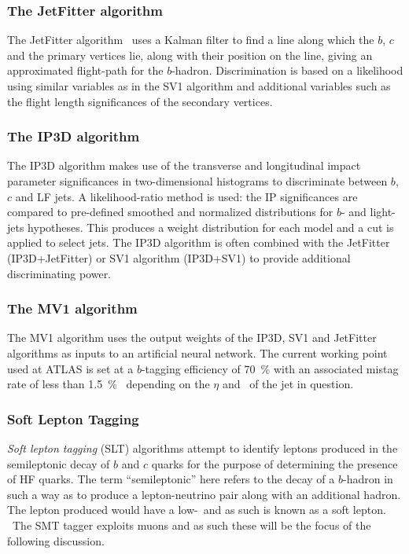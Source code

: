 \subsubsection{The JetFitter algorithm}

The JetFitter algorithm~\cite{Detector:TaggingJetFitter} uses a Kalman filter to find a line along which the $b$, $c$ and the primary vertices lie, along with their position on the line, giving an approximated flight-path for the $b$-hadron. Discrimination is based on a likelihood using similar variables as in the SV1 algorithm and additional variables such as the flight length significances of the secondary vertices.

\subsubsection{The IP3D algorithm}

The IP3D algorithm makes use of the transverse and longitudinal impact parameter significances in two-dimensional histograms to discriminate between $b$, $c$ and LF jets. A likelihood-ratio method is used: the IP significances are compared to pre-defined smoothed and normalized distributions for $b$- and light-jets hypotheses. This produces a weight distribution for each model and a cut is applied to select jets. The IP3D algorithm is often combined with the JetFitter (IP3D+JetFitter) or SV1 algorithm (IP3D+SV1) to provide additional discriminating power.

\subsubsection{The MV1 algorithm}

The MV1 algorithm uses the output weights of the IP3D, SV1 and JetFitter algorithms as inputs to an artificial neural network. The current working point used at ATLAS is set at a $b$-tagging efficiency of \SI{70}{\percent} with an associated mistag rate of less than \SI{1.5}{\percent}~\cite{DetectorBtaggingMistagMV1} depending on the $\eta$ and \pt\ of the jet in question.

\subsubsection{Soft Lepton Tagging} \label{sec:DetectorSLT}

\emph{Soft lepton tagging} (SLT) algorithms attempt to identify leptons produced in the semileptonic decay of $b$ and $c$ quarks for the purpose of determining the presence of HF quarks. The term ``semileptonic'' here refers to the decay of a $b$-hadron in such a way as to produce a lepton-neutrino pair along with an additional hadron. The lepton produced would have a low-\pt\ and as such is known as a soft lepton. \ The SMT tagger exploits muons and as such these will be the focus of the following discussion. 

